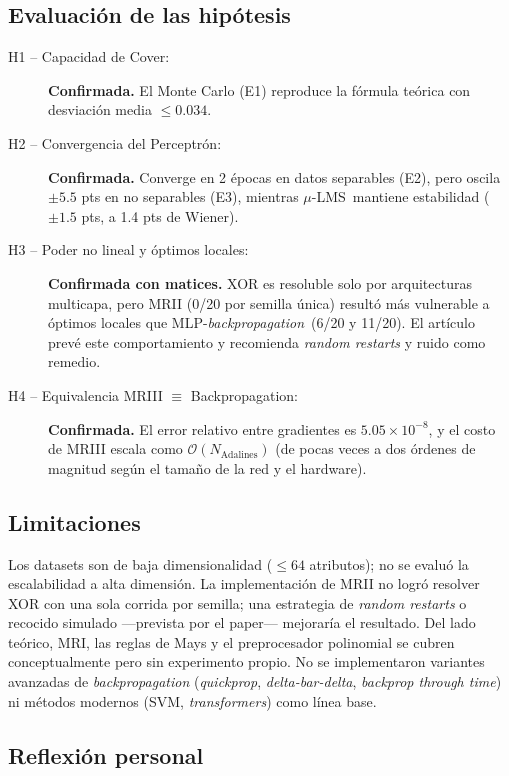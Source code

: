 \documentclass[11pt,a4paper]{article}
\newcommand{\muLMS}{$\mu$-LMS}
\newcommand{\bp}{\textit{backpropagation}}
\begin{document}
\subsection{Evaluación de las hipótesis}

\begin{description}
    \item[H1 -- Capacidad de Cover:] \textbf{Confirmada.} El Monte Carlo (E1) reproduce la fórmula
    teórica con desviación media $\leq 0.034$.
    \item[H2 -- Convergencia del Perceptrón:] \textbf{Confirmada.} Converge en 2 épocas en datos
    separables (E2), pero oscila $\pm5.5$ pts en no separables (E3), mientras \muLMS~mantiene
    estabilidad ($\pm1.5$ pts, a 1.4 pts de Wiener).
    \item[H3 -- Poder no lineal y óptimos locales:] \textbf{Confirmada con matices.} XOR es
    resoluble solo por arquitecturas multicapa, pero MRII (0/20 por semilla única) resultó más
    vulnerable a óptimos locales que MLP-\bp~(6/20 y 11/20). El artículo prevé este comportamiento
    y recomienda \textit{random restarts} y ruido como remedio.
    \item[H4 -- Equivalencia MRIII $\equiv$ Backpropagation:] \textbf{Confirmada.} El error relativo
    entre gradientes es $5.05 \times 10^{-8}$, y el costo de MRIII escala como
    $\mathcal{O}(N_{\text{Adalines}})$ (de pocas veces a dos órdenes de magnitud según el tamaño de
    la red y el hardware).
\end{description}

\subsection{Limitaciones}

Los datasets son de baja dimensionalidad ($\leq 64$ atributos); no se evaluó la escalabilidad a
alta dimensión. La implementación de MRII no logró resolver XOR con una sola corrida por semilla;
una estrategia de \textit{random restarts} o recocido simulado —prevista por el paper— mejoraría el
resultado. Del lado teórico, MRI, las reglas de Mays y el preprocesador polinomial se cubren
conceptualmente pero sin experimento propio. No se implementaron variantes avanzadas de \bp
(\textit{quickprop}, \textit{delta-bar-delta}, \textit{backprop through time}) ni métodos modernos
(SVM, \textit{transformers}) como línea base.

\subsection{Reflexión personal}
\end{document}
